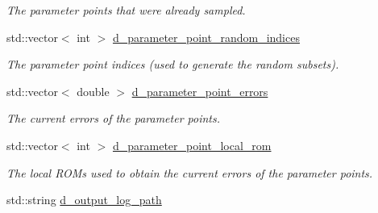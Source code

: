 \begin{DoxyCompactItemize}
\begin{DoxyCompactList}\small\item\em The parameter points that were already sampled. \end{DoxyCompactList}\item 
\hypertarget{class_c_a_r_o_m_1_1_greedy_parameter_point_sampler_a851a9858518cfe269e8793ede85e47a8}{std\-::vector$<$ int $>$ \hyperlink{class_c_a_r_o_m_1_1_greedy_parameter_point_sampler_a851a9858518cfe269e8793ede85e47a8}{d\-\_\-parameter\-\_\-point\-\_\-random\-\_\-indices}}\label{class_c_a_r_o_m_1_1_greedy_parameter_point_sampler_a851a9858518cfe269e8793ede85e47a8}

\begin{DoxyCompactList}\small\item\em The parameter point indices (used to generate the random subsets). \end{DoxyCompactList}\item 
\hypertarget{class_c_a_r_o_m_1_1_greedy_parameter_point_sampler_a5e9c41069dd34fb560467297a8142109}{std\-::vector$<$ double $>$ \hyperlink{class_c_a_r_o_m_1_1_greedy_parameter_point_sampler_a5e9c41069dd34fb560467297a8142109}{d\-\_\-parameter\-\_\-point\-\_\-errors}}\label{class_c_a_r_o_m_1_1_greedy_parameter_point_sampler_a5e9c41069dd34fb560467297a8142109}

\begin{DoxyCompactList}\small\item\em The current errors of the parameter points. \end{DoxyCompactList}\item 
\hypertarget{class_c_a_r_o_m_1_1_greedy_parameter_point_sampler_a698abd4af121a4f6e4d899dc65dc74e9}{std\-::vector$<$ int $>$ \hyperlink{class_c_a_r_o_m_1_1_greedy_parameter_point_sampler_a698abd4af121a4f6e4d899dc65dc74e9}{d\-\_\-parameter\-\_\-point\-\_\-local\-\_\-rom}}\label{class_c_a_r_o_m_1_1_greedy_parameter_point_sampler_a698abd4af121a4f6e4d899dc65dc74e9}

\begin{DoxyCompactList}\small\item\em The local R\-O\-Ms used to obtain the current errors of the parameter points. \end{DoxyCompactList}\item 
\hypertarget{class_c_a_r_o_m_1_1_greedy_parameter_point_sampler_a7de8b884a70ea5a395cf41a3eb389d9f}{std\-::string \hyperlink{class_c_a_r_o_m_1_1_greedy_parameter_point_sampler_a7de8b884a70ea5a395cf41a3eb389d9f}{d\-\_\-output\-\_\-log\-\_\-path}}\label{class_c_a_r_o_m_1_1_greedy_parameter_point_sampler_a7de8b884a70ea5a395cf41a3eb389d9f}


\end{DoxyCompactItemize}
